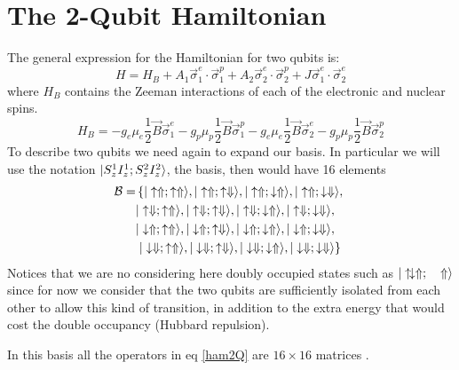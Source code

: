 \section{The 2-Qubit Hamiltonian}
The general expression for the Hamiltonian for two qubits is:
\begin{equation}
  H = H_B +A_1\vec{\sigma}^e_1\cdot\vec{\sigma}^p_1
      +A_2\vec{\sigma}^e_2\cdot\vec{\sigma}^p_2
      +J\vec{\sigma}^e_1\cdot\vec{\sigma}^e_2
\label{ham2Q}
\end{equation}
where $H_B$ contains the Zeeman interactions of each of the electronic and nuclear spins.
\begin{equation}
  H_B = -g_e\mu_e\frac{1}{2}\vec{B}\vec{\sigma}^e_1
      -g_p\mu_p\frac{1}{2}\vec{B}\vec{\sigma}^p_1
      -g_e\mu_e\frac{1}{2}\vec{B}\vec{\sigma}^e_2
      -g_p\mu_p\frac{1}{2}\vec{B}\vec{\sigma}^p_2
\end{equation}
To describe two qubits we need again to expand our basis. In particular we will use the notation $|S^1_zI^1_z;S^2_zI^2_z\rangle$, the basis, then would have 16 elements
\begin{equation}
\begin{split}
 \mathcal{B} =  &\left\{|\uparrow\Uparrow;\uparrow\Uparrow\rangle,|\uparrow\Uparrow;\uparrow\Downarrow\rangle,|\uparrow\Uparrow;\downarrow\Uparrow\rangle,|\uparrow\Uparrow;\downarrow\Downarrow\rangle,\right.\\
  &|\uparrow\Downarrow;\uparrow\Uparrow\rangle,|\uparrow\Downarrow;\uparrow\Downarrow\rangle,|\uparrow\Downarrow;\downarrow\Uparrow\rangle,|\uparrow\Downarrow;\downarrow\Downarrow\rangle,\\
  &|\downarrow\Uparrow;\uparrow\Uparrow\rangle,|\downarrow\Uparrow;\uparrow\Downarrow\rangle,|\downarrow\Uparrow;\downarrow\Uparrow\rangle,|\downarrow\Uparrow;\downarrow\Downarrow\rangle,\\
  &\left. |\downarrow\Downarrow;\uparrow\Uparrow\rangle,|\downarrow\Downarrow;\uparrow\Downarrow\rangle,|\downarrow\Downarrow;\downarrow\Uparrow\rangle,|\downarrow\Downarrow;\downarrow\Downarrow\rangle \right\}
\end{split}
\end{equation}
Notices that we are no considering here doubly occupied states such as $|\uparrow\mathrel{\mspace{-3mu}}\downarrow\Uparrow;\quad\Uparrow\rangle$ since for now we consider that the two qubits are sufficiently isolated from each other to allow this kind of transition, in addition to the extra energy that would cost the double occupancy (Hubbard repulsion).

In this basis all the operators in eq \eqref{ham2Q} are $16\times16$ matrices .

